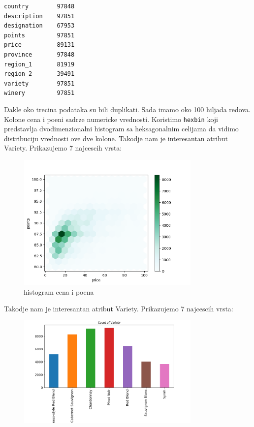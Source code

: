 \documentclass[11pt]{article} %
\begin{document}
\begin{lstlisting}
country        97848
description    97851
designation    67953
points         97851
price          89131
province       97848
region_1       81919
region_2       39491
variety        97851
winery         97851
\end{lstlisting}

Dakle oko trecina podataka su bili duplikati. Sada imamo oko 100 hiljada redova.\newline
Kolone cena i poeni sadrze numericke vrednosti. Koristimo \lstinline{hexbin} koji predstavlja 
dvodimenzionalni histogram sa heksagonalnim celijama da vidimo distribuciju vrednosti ove dve
kolone. 
Takodje nam je interesantan atribut Variety. Prikazujemo 7 najcescih vrsta:
\begin{figure}[h!]
	\centering
		\includegraphics[width=0.8\textwidth]{hexbar}
		\caption{histogram cena i poena}
	\end{figure}
Takodje nam je interesantan atribut Variety. Prikazujemo 7 najcescih vrsta:
\begin{figure}[h!]
	\centering
		\includegraphics[width=0.8\textwidth]{variety_count}
	\end{figure}
	
\end{document}
